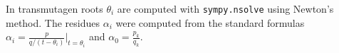 In transmutagen roots $\theta_i$ are computed with
\texttt{sympy.\allowbreak{}nsolve} using Newton's method.  The residues
$\alpha_i$ were computed from the standard formulas
$\alpha_i = \frac{p}{q/(t - \theta_i)}|_{t=\theta_i}$ and
$\alpha_0=\frac{p_k}{q_k}$.
